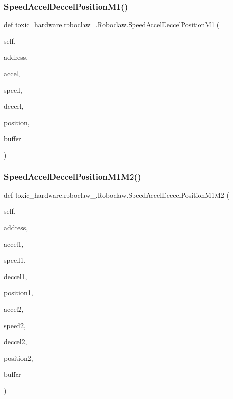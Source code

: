 \subsubsection{\texorpdfstring{Speed\+Accel\+Deccel\+Position\+M1()}{SpeedAccelDeccelPositionM1()}}
{\footnotesize\ttfamily def toxic\+\_\+hardware.\+roboclaw\+\_.\+Roboclaw.\+Speed\+Accel\+Deccel\+Position\+M1 (\begin{DoxyParamCaption}\item[{}]{self,  }\item[{}]{address,  }\item[{}]{accel,  }\item[{}]{speed,  }\item[{}]{deccel,  }\item[{}]{position,  }\item[{}]{buffer }\end{DoxyParamCaption})}

\mbox{\label{classtoxic__hardware_1_1roboclaw__3_1_1Roboclaw_aa835c77821627c7563e526958234f449}} 
\subsubsection{\texorpdfstring{Speed\+Accel\+Deccel\+Position\+M1\+M2()}{SpeedAccelDeccelPositionM1M2()}}
{\footnotesize\ttfamily def toxic\+\_\+hardware.\+roboclaw\+\_.\+Roboclaw.\+Speed\+Accel\+Deccel\+Position\+M1\+M2 (\begin{DoxyParamCaption}\item[{}]{self,  }\item[{}]{address,  }\item[{}]{accel1,  }\item[{}]{speed1,  }\item[{}]{deccel1,  }\item[{}]{position1,  }\item[{}]{accel2,  }\item[{}]{speed2,  }\item[{}]{deccel2,  }\item[{}]{position2,  }\item[{}]{buffer }\end{DoxyParamCaption})}

